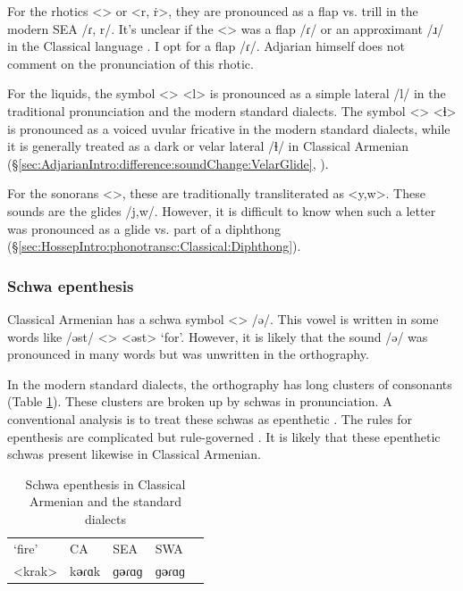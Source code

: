 For the rhotics <> or <r, ṙ>, they are pronounced as a flap vs. trill in the modern SEA /ɾ, r/. It's unclear if the <> was a flap /ɾ/ or an approximant /ɹ/ in the Classical language \citep[1040]{Macak-2017-PhonoClassicalArmenian}. I opt for a flap /ɾ/. Adjarian himself does not comment on the pronunciation of this rhotic. 


For the liquids, the symbol <> <l> is pronounced as a simple lateral /l/ in the traditional pronunciation and the modern standard dialects. The symbol <> <ɬ> is pronounced as a voiced uvular fricative in the modern standard dialects, while it is generally treated as a dark or velar lateral /ɬ/ in Classical Armenian (\S\ref{sec:AdjarianIntro:difference:soundChange:VelarGlide}, \citealt[ch2]{Macak-2016-StudiesClassicalModernArmenianPhono}).

For the sonorans <>, these are traditionally transliterated as <y,w>. These sounds are the glides /j,w/. However, it is difficult to know when such a letter was pronounced as a glide vs. part of a diphthong (\S\ref{sec:HossepIntro:phonotransc:Classical:Diphthong}). 

\subsubsection{Schwa epenthesis}\label{sec:HossepIntro:phonotransc:CA:schwa}


Classical Armenian has a schwa symbol <> /ə/. This vowel is written in some words like /əst/ <> <əst> `for'. However, it is likely that the sound /ə/ was pronounced in many words but was unwritten in the orthography. 

In the modern standard dialects, the orthography has long clusters of consonants (Table \ref{tab:HossepIntro:schwaEpen}). These clusters are broken up by schwas in pronunciation. A conventional analysis is to treat these schwas as epenthetic \citep{Vaux-1998-ArmenianPhono}. The rules for epenthesis are complicated but rule-governed \citep[cf.][]{Dolatian-prep-Schwa}. It is likely that these epenthetic schwas present likewise in Classical Armenian. 



\begin{table}[H]
	\caption{Schwa epenthesis in Classical Armenian and the standard dialects} \label{tab:HossepIntro:schwaEpen}
	\centering 
	\begin{tabular}{|l| lll| l| }
		\hline `fire'	& CA & SEA & SWA & \\
		<krak> & k\textbf{ə}ɾɑk &ɡ\textbf{ə}ɾɑɡ &ɡ\textbf{ə}ɾɑɡ & \armenian{կրակ}
		\\\hline 
	\end{tabular}
\end{table}

